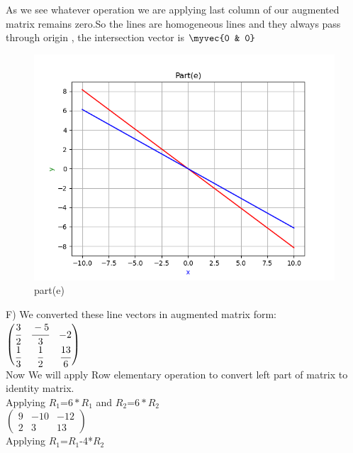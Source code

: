 As we see whatever operation we are applying last column of our augmented matrix remains zero.So the lines are homogeneous lines and they always pass through  origin , the intersection vector is $\myvec{0 & 0}$\\

\renewcommand{\thefigure}{\theenumi.\arabic{figure}}
\begin{figure}[!ht]
    \centering
    \includegraphics[width=\columnwidth]{./figures/A1_parte}
\caption{part(e)}
\label{fig: part(e)}
\end{figure}

F)
We converted these line vectors in augmented matrix form:\\ 

$\begin{pmatrix}
\cfrac{3}{2} & \cfrac{-5}{3} & -2\\
\cfrac{1}{3} & \cfrac{1}{2} & \cfrac{13}{6}
\end{pmatrix}$\\
 

Now We will apply Row elementary operation to convert left part of matrix to identity matrix.\\

Applying $R_{1}$=$6*R_{1}$ and $R_{2}$=$6*R_{2}$\\

$\begin{pmatrix}
9 & -10 & -12\\
2 & 3 & 13
\end{pmatrix}$\\

Applying $R_{1}$=$R_{1}$-4*$R_{2}$\\

